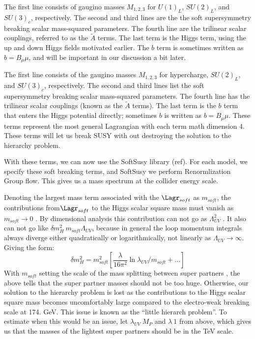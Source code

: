 The first line consists of gaugino masses $M_{1,2,3}$ for $U(1)_L$, $SU(2)_L$, and $SU(3)_c$, respectively. The second and third lines are the the soft supersymmetry breaking scalar mass-squared parameters. The fourth line are the trilinear scalar couplings, referred to as the $\tilde{A}$ terms. The last term is the Higgs term, using the up and down Higgs fields motivated earlier. The $b$ term is sometimes written as $b= B_\mu \mu$, and will be important in our discussion a bit later.

The first line consists of the gaugino masses $M_{1,2,3}$ for hypercharge, $SU(2)_L$, and $SU(3)_c$, respectively. The second and third lines list the soft supersymmetry breaking scalar mass-squared parameters. The fourth line has the trilinear scalar couplings (known as the $\tilde{A}$ terms). The last term is the $b$ term that enters the Higgs potential directly; sometimes $b$ is written as $b= B_\mu \mu$. These terms represent the most general Lagrangian with each term math dimension 4. These terms will let us break SUSY with out destroying the solution to the hierarchy problem.

With these terms, we can now use the SoftSusy library (ref). For each model, we specify these soft breaking terms, and SoftSusy we perform Renormlization Group flow. This gives us a mass spectrum at the collider energy scale. 



Denoting the largest mass term associated with the $\Lagr_{soft}$ as  $m_{soft}$, the contributions from$\Lagr_{soft}$ to the Higgs scalar square mass must vanish as $m_{soft} \rightarrow 0$ . By dimensional analysis this contribution can not go as $\Lambda_{UV}^2$ . It also can not go like $\delta m_H^2 ~ m_{soft}\Lambda_{UV}$, because in general the loop momentum integrals always diverge either quadratically or logarithmically, not linearly as $\Lambda_{UV} \rightarrow \infty$. Giving the form:
\begin{equation*}
    \delta m_H^2 = m_{soft}^2 [\frac{\lambda}{16 \pi^2}\ln{\lambda_{UV}/m_{soft}}+ ...]
\end{equation*}
With $m_{soft}$ setting the scale of the mass splitting between super partners , the above tells that the super partner masses should not be too huge. Otherwise, our solution to the hierarchy problem is lost as the contributions to the Higgs scalar square mass becomes uncomfortably large compared to the electro-weak breaking scale at 174. GeV. This issue is known as the “little hierarch problem”. To estimate when this would be an issue, let $\lambda_{UV} ~ M_P$ and $\lambda ~ 1$ from above, which gives us that the masses of the lightest super partners should be in the TeV scale. 

